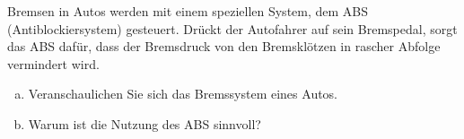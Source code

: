 %
\begin{aufgabe}
	Bremsen in Autos werden mit einem speziellen System, dem  ABS (Antiblockiersystem) gesteuert.
	Drückt der Autofahrer auf sein Bremspedal, sorgt das ABS dafür, dass der Bremsdruck von den Bremsklötzen in rascher Abfolge
	vermindert wird.
	\begin{enumerate} [a)]
		\item Veranschaulichen Sie sich das Bremssystem eines Autos.
		\item Warum ist die Nutzung des ABS sinnvoll?
	\end{enumerate}
\end{aufgabe}
